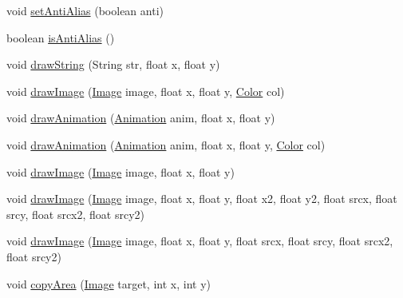 \begin{DoxyCompactItemize}
\item 
void \mbox{\hyperlink{classorg_1_1newdawn_1_1slick_1_1_graphics_aab07c0e6d3f7800fa60c3d26d27f80a1}{set\+Anti\+Alias}} (boolean anti)
\item 
boolean \mbox{\hyperlink{classorg_1_1newdawn_1_1slick_1_1_graphics_aee336332347f6915a60ed9e34e171cc0}{is\+Anti\+Alias}} ()
\item 
void \mbox{\hyperlink{classorg_1_1newdawn_1_1slick_1_1_graphics_a94021ab8d17140db411b6bb92f35ef31}{draw\+String}} (String str, float x, float y)
\item 
void \mbox{\hyperlink{classorg_1_1newdawn_1_1slick_1_1_graphics_a2683a74a9890eb1a58999d397c19a0f0}{draw\+Image}} (\mbox{\hyperlink{classorg_1_1newdawn_1_1slick_1_1_image}{Image}} image, float x, float y, \mbox{\hyperlink{classorg_1_1newdawn_1_1slick_1_1_color}{Color}} col)
\item 
void \mbox{\hyperlink{classorg_1_1newdawn_1_1slick_1_1_graphics_a61bb40cbf9441b854f36c034307aa178}{draw\+Animation}} (\mbox{\hyperlink{classorg_1_1newdawn_1_1slick_1_1_animation}{Animation}} anim, float x, float y)
\item 
void \mbox{\hyperlink{classorg_1_1newdawn_1_1slick_1_1_graphics_a2cd83a283ae06004e54399deb0dc08f9}{draw\+Animation}} (\mbox{\hyperlink{classorg_1_1newdawn_1_1slick_1_1_animation}{Animation}} anim, float x, float y, \mbox{\hyperlink{classorg_1_1newdawn_1_1slick_1_1_color}{Color}} col)
\item 
void \mbox{\hyperlink{classorg_1_1newdawn_1_1slick_1_1_graphics_a308b4057983d9b88b972e8cbd3a4d02e}{draw\+Image}} (\mbox{\hyperlink{classorg_1_1newdawn_1_1slick_1_1_image}{Image}} image, float x, float y)
\item 
void \mbox{\hyperlink{classorg_1_1newdawn_1_1slick_1_1_graphics_ae1eebdef6e9725bf658cb7bba0b2deec}{draw\+Image}} (\mbox{\hyperlink{classorg_1_1newdawn_1_1slick_1_1_image}{Image}} image, float x, float y, float x2, float y2, float srcx, float srcy, float srcx2, float srcy2)
\item 
void \mbox{\hyperlink{classorg_1_1newdawn_1_1slick_1_1_graphics_afaa5628d40436bb40f8e779f12077302}{draw\+Image}} (\mbox{\hyperlink{classorg_1_1newdawn_1_1slick_1_1_image}{Image}} image, float x, float y, float srcx, float srcy, float srcx2, float srcy2)
\item 
void \mbox{\hyperlink{classorg_1_1newdawn_1_1slick_1_1_graphics_adaf19c5b7ba46f3d31243939c8f995a6}{copy\+Area}} (\mbox{\hyperlink{classorg_1_1newdawn_1_1slick_1_1_image}{Image}} target, int x, int y)
\item 

\end{DoxyCompactItemize}
